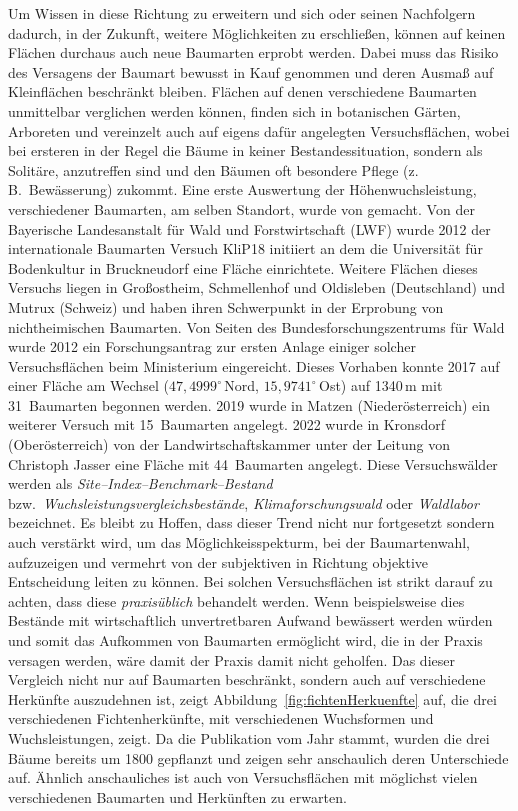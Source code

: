 \documentclass[twocolumn]{scrartcl}
\begin{document}
Um Wissen in diese Richtung zu erweitern und sich oder seinen
Nachfolgern dadurch, in der Zukunft, weitere Möglichkeiten zu
erschließen, können auf keinen Flächen durchaus auch neue Baumarten
erprobt werden. Dabei muss das Risiko des Versagens der Baumart
bewusst in Kauf genommen und deren Ausmaß auf Kleinflächen beschränkt
bleiben. Flächen auf denen verschiedene Baumarten unmittelbar
verglichen werden können, finden sich in botanischen Gärten, Arboreten
und vereinzelt auch auf eigens dafür angelegten Versuchsflächen, wobei
bei ersteren in der Regel die Bäume in keiner Bestandessituation,
sondern als Solitäre, anzutreffen sind und den Bäumen oft besondere
Pflege (z.\,B.\ Bewässerung) zukommt. Eine erste Auswertung der
Höhenwuchsleistung, verschiedener Baumarten, am selben Standort, wurde
von \cite{mayer1970anbauversuch} gemacht. Von der Bayerische
Landesanstalt für Wald und Forstwirtschaft (LWF) wurde 2012 der
internationale Baumarten Versuch KliP18 initiiert an dem die
Universität für Bodenkultur in Bruckneudorf eine Fläche
einrichtete. Weitere Flächen dieses Versuchs liegen in Großostheim,
Schmellenhof und Oldisleben (Deutschland) und Mutrux (Schweiz) und
haben ihren Schwerpunkt in der Erprobung von nichtheimischen
Baumarten. Von Seiten des Bundesforschungszentrums für Wald wurde 2012
ein Forschungsantrag zur ersten Anlage einiger solcher Versuchsflächen
beim Ministerium eingereicht. Dieses Vorhaben konnte 2017 auf einer
Fläche am Wechsel ($47,4999^{\circ}$\,Nord, $15,9741^{\circ}$\,Ost)
auf 1340\,m mit 31~Baumarten begonnen werden. 2019 wurde in Matzen
(Niederösterreich) ein weiterer Versuch mit 15~Baumarten
angelegt. 2022 wurde in Kronsdorf (Oberösterreich) von der
Landwirtschaftskammer unter der Leitung von Christoph Jasser eine
Fläche mit 44~Baumarten angelegt. Diese Versuchswälder werden als
\emph{Site--Index--Benchmark--Bestand} bzw.\
\emph{Wuchsleistungsvergleichsbestände}, \emph{Klimaforschungswald}
oder \emph{Waldlabor} bezeichnet. Es bleibt zu Hoffen, dass dieser
Trend nicht nur fortgesetzt sondern auch verstärkt wird, um das
Möglichkeisspekturm, bei der Baumartenwahl, aufzuzeigen und vermehrt
von der subjektiven in Richtung objektive Entscheidung leiten zu
können. Bei solchen Versuchsflächen ist strikt darauf zu achten, dass
diese \emph{praxisüblich} behandelt werden. Wenn beispielsweise dies
Bestände mit wirtschaftlich unvertretbaren Aufwand bewässert werden
würden und somit das Aufkommen von Baumarten ermöglicht wird, die in
der Praxis versagen werden, wäre damit der Praxis damit nicht
geholfen. Das dieser Vergleich nicht nur auf Baumarten beschränkt,
sondern auch auf verschiedene Herkünfte auszudehnen ist, zeigt
Abbildung~\ref{fig:fichtenHerkuenfte}
\citep[S.~86]{hegi1906IllustrierteFloraBd1} auf, die drei
verschiedenen Fichtenherkünfte, mit verschiedenen Wuchsformen und
Wuchsleistungen, zeigt. Da die Publikation vom Jahr
\citeyear{hegi1906IllustrierteFloraBd1} stammt, wurden die drei Bäume
bereits um 1800 gepflanzt und zeigen sehr anschaulich deren
Unterschiede auf. Ähnlich anschauliches ist auch von Versuchsflächen
mit möglichst vielen verschiedenen Baumarten und Herkünften zu
erwarten.
\end{document}
